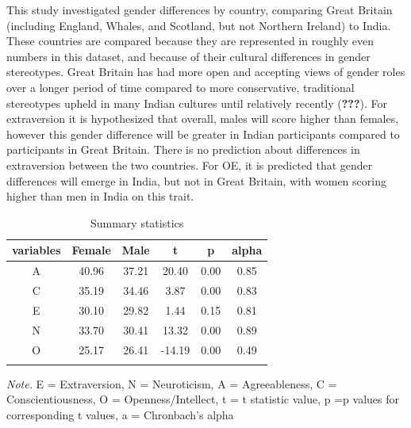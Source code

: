 \documentclass[
  english,
  man]{apa6}
\begin{document}
This study investigated gender differences by country, comparing Great Britain (including England, Whales, and Scotland, but not Northern Ireland) to India. These countries are compared because they are represented in roughly even numbers in this dataset, and because of their cultural differences in gender stereotypes. Great Britain has had more open and accepting views of gender roles over a longer period of time compared to more conservative, traditional stereotypes upheld in many Indian cultures until relatively recently ({\textbf{???}}). For extraversion it is hypothesized that overall, males will score higher than females, however this gender difference will be greater in Indian participants compared to participants in Great Britain. There is no prediction about differences in extraversion between the two countries. For OE, it is predicted that gender differences will emerge in India, but not in Great Britain, with women scoring higher than men in India on this trait.

\begin{table}[tbp]

\begin{center}
\begin{threeparttable}

\caption{\label{tab:descriptiveTable}Summary statistics}

\begin{tabular}{cccccc}
\toprule
variables & \multicolumn{1}{c}{Female} & \multicolumn{1}{c}{Male} & \multicolumn{1}{c}{t} & \multicolumn{1}{c}{p} & \multicolumn{1}{c}{alpha}\\
\midrule
A & 40.96 & 37.21 & 20.40 & 0.00 & 0.85\\
C & 35.19 & 34.46 & 3.87 & 0.00 & 0.83\\
E & 30.10 & 29.82 & 1.44 & 0.15 & 0.81\\
N & 33.70 & 30.41 & 13.32 & 0.00 & 0.89\\
O & 25.17 & 26.41 & -14.19 & 0.00 & 0.49\\
\bottomrule
\addlinespace
\end{tabular}

\begin{tablenotes}[para]
\normalsize{\textit{Note.} E = Extraversion, N = Neuroticism, A = Agreeableness, C = Conscientiousness, O = Openness/Intellect, t = t statistic value, p =p values for corresponding t values, a = Chronbach's alpha}
\end{tablenotes}

\end{threeparttable}
\end{center}

\end{table}
\end{document}
